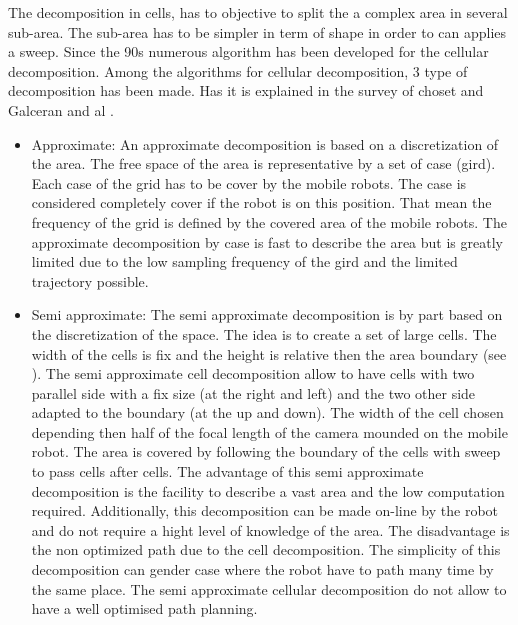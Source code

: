 The decomposition in cells, has to objective to split the a complex area in several sub-area. The sub-area has to be simpler in term of shape in order to can applies a sweep. 
Since the 90s numerous algorithm has been developed for the cellular decomposition. Among the algorithms for cellular decomposition, 3 type of decomposition has been made. Has it is explained in the survey of choset  \cite{214*choset2001} and  Galceran and al \cite{66*galceran2013}. 
\begin{itemize}
	\item Approximate: 
		An approximate decomposition is based on a discretization of the area. The free space of the area is representative by a set of case (gird). Each case of the grid has to be cover by the mobile robots. The case is considered completely cover if the robot is on this position. That mean the frequency of the grid is defined by the covered area of the mobile robots. 
		The approximate decomposition by case is fast to describe the area but is greatly limited due to the low sampling frequency of the gird and the limited trajectory possible.\\
	 
	\item Semi approximate: 
	 The semi approximate decomposition is by part based on the discretization of the space. The idea is to create a set of large cells. The width of the cells is fix and the height is relative then the area boundary (see \citep{214*choset2001}). 
	 The semi approximate cell decomposition allow to have cells with two parallel side with a fix size (at the right and left) and  the  two other side adapted to the boundary (at the up and down).  The width  of  the cell chosen depending then half of the focal length of the camera mounded on the mobile robot. The area is covered by following the boundary of the cells with sweep to pass cells  after cells.
	 The advantage of this semi approximate decomposition is the facility to describe a vast area and the low computation required. Additionally, this decomposition can be made on-line by the robot and do not require a hight level of knowledge of the area. 
	 The disadvantage is the non optimized path due to the cell decomposition. The simplicity  of this decomposition  can gender case where the robot have to path many time by the same place. The semi approximate cellular decomposition do not allow to have a well optimised path planning. \\
	 

\end{itemize}
